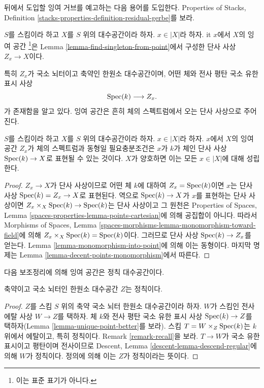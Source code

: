 \noindent
뒤에서 도입할 잉여 거브를 예고하는 다음 용어를 도입한다. Properties
of Stacks, Definition
\ref{stacks-properties-definition-residual-gerbe}를 보라.

\begin{definition}
\label{definition-residual-space}
$S$를 스킴이라 하고 $X$를 $S$ 위의 대수공간이라 하자.
$x \in |X|$라 하자. {it $x$에서 $X$의 잉여 공간}
\footnote{이는 표준 표기가 아니다.}은 Lemma
\ref{lemma-find-singleton-from-point}에서 구성한 단사 사상
$Z_x \to X$이다.
\end{definition}

\noindent
특히 $Z_x$가 국소 뇌터이고 축약인 한원소 대수공간이며, 어떤 체와
전사 평탄 국소 유한 표시 사상
$$
\mathop{\mathrm{Spec}}(k) \longrightarrow Z_x.
$$
가 존재함을 알고 있다. 잉여 공간은 흔히 체의 스펙트럼에서 오는
단사 사상으로 주어진다.

\begin{lemma}
\label{lemma-residual-space-monomorphism}
$S$를 스킴이라 하고 $X$를 $S$ 위의 대수공간이라 하자.
$x \in |X|$라 하자. $x$에서 $X$의 잉여 공간 $Z_x$가 체의
스펙트럼과 동형일 필요충분조건은 $x$가 $k$가 체인 단사 사상
$\mathop{\mathrm{Spec}}(k) \to X$로 표현될 수 있는 것이다. $X$가 양호하면 이는 모든
$x \in |X|$에 대해 성립한다.
\end{lemma}

\begin{proof}
$Z_x \to X$가 단사 사상이므로 어떤 체 $k$에 대하여
$Z_x = \mathop{\mathrm{Spec}}(k)$이면 $x$는 단사 사상
$\mathop{\mathrm{Spec}}(k) = Z_x \to X$로 표현된다. 역으로 $\mathop{\mathrm{Spec}}(k) \to X$가 $x$를
표현하는 단사 사상이면 $Z_x \times_X \mathop{\mathrm{Spec}}(k) \to \mathop{\mathrm{Spec}}(k)$는
단사 사상이고 그 원천은 Properties of Spaces, Lemma
\ref{spaces-properties-lemma-points-cartesian}에 의해 공집합이 아니다.
따라서 Morphisms of Spaces, Lemma
\ref{spaces-morphisms-lemma-monomorphism-toward-field}에 의해
$Z_x \times_X \mathop{\mathrm{Spec}}(k) = \mathop{\mathrm{Spec}}(k)$이다. 그러므로 단사 사상
$\mathop{\mathrm{Spec}}(k) \to Z_x$를 얻는다. Lemma
\ref{lemma-monomorphism-into-point}에 의해 이는 동형이다. 마지막
명제는 Lemma \ref{lemma-decent-points-monomorphism}에서 따른다.
\end{proof}

\noindent
다음 보조정리에 의해 잉여 공간은 정칙 대수공간이다.

\begin{lemma}
\label{lemma-residual-space-regular}
축약이고 국소 뇌터인 한원소 대수공간 $Z$는 정칙이다.
\end{lemma}

\begin{proof}
$Z$를 스킴 $S$ 위의 축약 국소 뇌터 한원소 대수공간이라 하자.
$W$가 스킴인 전사 에탈 사상 $W \to Z$를 택하자. 체 $k$와 전사 평탄
국소 유한 표시 사상 $\mathop{\mathrm{Spec}}(k) \to Z$를 택하자(Lemma
\ref{lemma-unique-point-better}를 보라). 스킴
$T = W \times_Z \mathop{\mathrm{Spec}}(k)$는 $k$ 위에서 에탈이고, 특히 정칙이다.
Remark \ref{remark-recall}을 보라. $T \to W$가 국소 유한 표시이고
평탄이며 전사이므로 Descent, Lemma
\ref{descent-lemma-descend-regular}에 의해 $W$가 정칙이다. 정의에
의해 이는 $Z$가 정칙이라는 뜻이다.
\end{proof}

